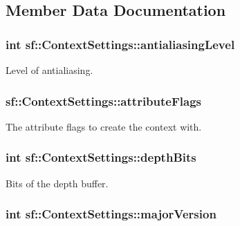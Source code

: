\subsection{Member Data Documentation}
\hypertarget{structsf_1_1_context_settings_ac4a097be18994dba38d73f36b0418bdc}{
\subsubsection[{antialiasing\-Level}]{ {\bf int} sf\-::\-Context\-Settings\-::antialiasing\-Level}}\label{structsf_1_1_context_settings_ac4a097be18994dba38d73f36b0418bdc}


Level of antialiasing. 

\hypertarget{structsf_1_1_context_settings_a0ef3fc53802bc0197d2739466915ada5}{
\subsubsection[{attribute\-Flags}]{ sf\-::\-Context\-Settings\-::attribute\-Flags}}\label{structsf_1_1_context_settings_a0ef3fc53802bc0197d2739466915ada5}


The attribute flags to create the context with. 

\hypertarget{structsf_1_1_context_settings_a4809e22089c2af7276b8809b5aede7bb}{
\subsubsection[{depth\-Bits}]{ {\bf int} sf\-::\-Context\-Settings\-::depth\-Bits}}\label{structsf_1_1_context_settings_a4809e22089c2af7276b8809b5aede7bb}


Bits of the depth buffer. 

\hypertarget{structsf_1_1_context_settings_a99a680d5c15a7e34c935654155dd5166}{
\subsubsection[{major\-Version}]{ {\bf int} sf\-::\-Context\-Settings\-::major\-Version}}\label{structsf_1_1_context_settings_a99a680d5c15a7e34c935654155dd5166}


